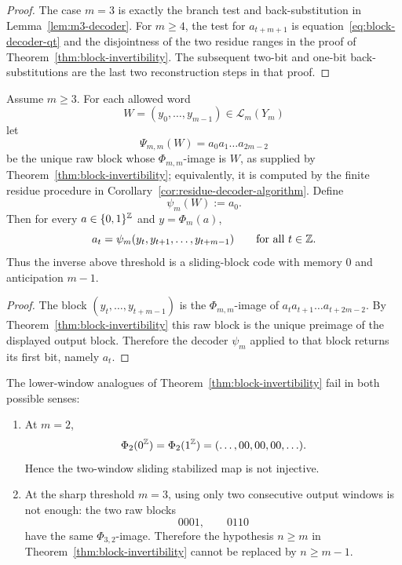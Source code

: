 \begin{proof}
The case $m=3$ is exactly the branch test and back-substitution in
Lemma~\ref{lem:m3-decoder}.  For $m\ge4$, the test for $a_{t+m+1}$ is
equation~\eqref{eq:block-decoder-qt} and the disjointness of the two residue
ranges in the proof of Theorem~\ref{thm:block-invertibility}.  The subsequent
two-bit and one-bit back-substitutions are the last two reconstruction steps
in that proof.
\end{proof}

\begin{corollary}\label{cor:explicit-decoder}
Assume $m\ge3$.  For each allowed word
\[
W=(y_0,\ldots,y_{m-1})\in\mathcal L_m(Y_m)
\]
let
\[
\Psi_{m,m}(W)=a_0a_1\ldots a_{2m-2}
\]
be the unique raw block whose $\Phi_{m,m}$-image is $W$, as supplied by
Theorem~\ref{thm:block-invertibility}; equivalently, it is computed by the
finite residue procedure in Corollary~\ref{cor:residue-decoder-algorithm}.
Define
\[
\psi_m(W):=a_0.
\]
Then for every $a\in\{0,1\}^{\mathbb{Z}}$ and $y=\Phi_m(a)$,
\[
a_t=\psi_m(y_t,y_{t+1},\ldots,y_{t+m-1})
\qquad\text{for all }t\in\mathbb{Z}.
\]
Thus the inverse above threshold is a sliding-block code with memory $0$ and
anticipation $m-1$.
\end{corollary}

\begin{proof}
The block $(y_t,\ldots,y_{t+m-1})$ is the $\Phi_{m,m}$-image of
$a_ta_{t+1}\ldots a_{t+2m-2}$.  By Theorem~\ref{thm:block-invertibility} this
raw block is the unique preimage of the displayed output block.  Therefore
the decoder $\psi_m$ applied to that block returns its first bit, namely
$a_t$.
\end{proof}

\begin{proposition}\label{prop:low-window-counterexamples}
The lower-window analogues of Theorem~\ref{thm:block-invertibility} fail in
both possible senses:
\begin{enumerate}[label=(\roman*),leftmargin=*,itemsep=2pt]
  \item At $m=2$,
  \[
  \Phi_2(0^{\mathbb{Z}})=\Phi_2(1^{\mathbb{Z}})=(\ldots,00,00,00,\ldots).
  \]
  Hence the two-window sliding stabilized map is not injective.
  \item At the sharp threshold $m=3$, using only two consecutive output
  windows is not enough: the two raw blocks
  \[
  0001,\qquad 0110
  \]
  have the same $\Phi_{3,2}$-image.  Therefore the hypothesis
  $n\ge m$ in Theorem~\ref{thm:block-invertibility} cannot be replaced by
  $n\ge m-1$.
\end{enumerate}
\end{proposition}

